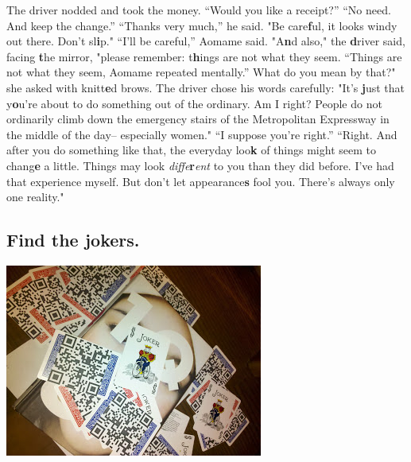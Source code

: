 \medskip

The driver nodded and took the money. ``Would you like a receipt?''
``No need. And keep the change.'' ``Thanks very much,'' he said. "Be
care\textbf{f}ul, it looks windy out there. Don't sl\textbf{i}p."
``I'll be careful,'' Aomame said. "A\textbf{n}d also," the
\textbf{d}river said, facing \textbf{t}he mirror, "please remember:
t\textbf{h}ings are not what they seem. ``Things are not what they
seem, Aomame repeated mentally.'' What do you mean by that?" she asked
with knitt\textbf{e}d brows. The driver chose his words carefully:
"It's \textbf{j}ust that y\textbf{o}u're about to do something out of
the ordinary. Am I right?  People do not ordinarily climb down the
emergency stairs of the Metropolitan Expressway in the middle of the
day-- especially women."  ``I suppose you're right.'' ``Right. And
after you do something like that, the everyday loo\textbf{k} of things
might seem to chang\textbf{e} a little. Things may look
\emph{diffe}\textbf{r}\hspace{-.1em}\emph{ent} to you than they did
before. I've had that experience myself. But don't let
appearance\textbf{s} fool you. There's always only one reality."

\subsection{Find the jokers.}

\begin{center}
\includegraphics{../pictures/jokers.jpg}
\end{center}

